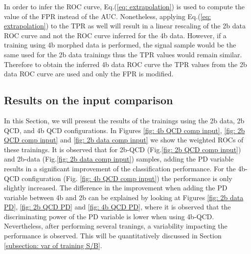 In order to infer the ROC curve, Eq.(\ref{eq: extrapolation}) is used to compute the value of the FPR instead of the AUC. Nonetheless, applying Eq.(\ref{eq: extrapolation}) to the TPR as well will result in a linear rescaling of the 2b data ROC curve and not the ROC curve inferred for the 4b data. However, if a training using 4b morphed data is performed, the signal sample would be the same used for the 2b data trainings thus the TPR values would remain similar. Therefore to obtain the inferred 4b data ROC curve the TPR values from the 2b data ROC curve are used and only the FPR is modified.



\subsection{Results on the input comparison} \label{subsection: results on the trainings}


In this Section, we will present the results of the trainings using the 2b data, 2b QCD, and 4b QCD configurations. In Figures \ref{fig: 4b QCD comp input}, \ref{fig: 2b QCD comp input} and \ref{fig: 2b data comp input} we show the weighted ROCs of these trainings. It is observed that for 2b-QCD (Fig.\ref{fig: 2b QCD comp input}) and 2b-data (Fig.\ref{fig: 2b data comp input}) samples, adding the PD variable results in a significant improvement of the classification performance. For the 4b-QCD configuration (Fig. \ref{fig: 4b QCD comp input})  the performance is only slightly increased.  The difference in the improvement when adding the PD variable between 4b and 2b can be explained by looking at Figures \ref{fig: 2b data PD}, \ref{fig: 2b QCD PD} and \ref{fig: 4b QCD PD}, where it is observed that the discriminating power of the PD variable is lower when using 4b-QCD. Nevertheless, after performing several tranings, a variability impacting the performance is observed. This will be quantitatively discussed in Section \ref{subsection: var of training S/B}.


